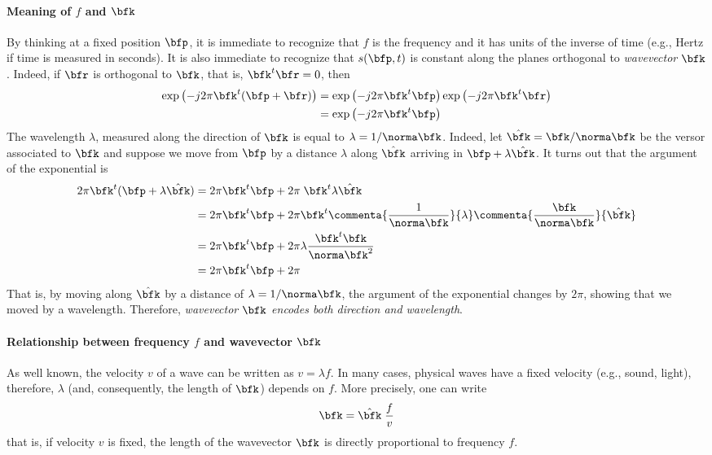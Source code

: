 \documentclass[11pt]{article}
\newcommand{\wv}{\bfk}
\newcommand{\wvn}{\hat\wv}
\newcommand{\x}[1][0]{\ifcase #1\bfp \or\bfq\else x#1\fi}
\newcommand{\sig}[1][\x,t]{s({#1})}
\begin{document}
\paragraph{Meaning of $f$ and $\wv$} By thinking
 at a fixed position $\x$, it 
is immediate to recognize that $f$ is the frequency and it has units
of the inverse of time (e.g., Hertz if time is measured in seconds).
It is also immediate to recognize that $\sig$ is constant along the
planes orthogonal to \emph{wavevector} $\wv$. Indeed, if $\bfr$ is
orthogonal to $\wv$, that is, $\wv^t\bfr=0$, then
%
\begin{equation}
  \label{eq:2;beamforming-notes}
  \begin{split}
\exp\left(-j 2\pi \wv^t(\x+\bfr) \right)
&= \exp\left(-j 2\pi \wv^t\x \right)
\exp\left(-j 2\pi \wv^t\bfr \right)\\
&= \exp\left(-j 2\pi \wv^t\x \right)
  \end{split}
\end{equation}
%
  The wavelength $\lambda$, measured along the direction of $\wv$ is
  equal to $\lambda=1/\norma\wv$.  Indeed, let $\wvn = \wv/\norma\wv$
  be the versor associated to $\wv$ and suppose we move from $\x$ by a
  distance $\lambda$ along $\wvn$ arriving in $\x+\lambda\wvn$.  It
  turns out that the argument of the exponential is
%
\begin{equation}
\label{eq:3;beamforming-notes}
\begin{split}
  2\pi \wv^t(\x+\lambda\wvn)
  &=   2\pi \wv^t\x+2\pi\;\wv^t \lambda\wvn\\
  &=   2\pi \wv^t\x+2\pi\wv^t \commenta{\frac{1}{\norma\wv}}{\lambda}
  \commenta{\frac{\wv}{\norma\wv}}{\wvn} \\
  &=   2\pi \wv^t\x+2\pi \lambda\frac{\wv^t\wv}{\norma\wv^2}\\
  &=   2\pi \wv^t\x+2\pi
\end{split}
\end{equation}
%
That is, by moving along $\wvn$ by a distance of $\lambda=1/\norma\wv$, the
argument of the exponential changes by $2\pi$, showing that we moved
by a wavelength.  Therefore, \emph{wavevector $\wv$ encodes both
  direction and wavelength}.


\paragraph{Relationship between frequency $f$ and wavevector $\wv$}
As well known, the velocity $v$ of a wave can be written as $v=\lambda
f$. In many cases, physical waves have a fixed velocity (e.g., sound,
light), therefore,   $\lambda$ (and, consequently, the length
of $\wv$) depends on $f$.  More precisely, one can write
%
\begin{equation}
\label{eq:4;beamforming-notes}
\wv = \wvn\; \frac{f}{v}
\end{equation}
%
that is, if velocity $v$ is fixed, the length of the wavevector $\wv$ is
directly proportional to frequency $f$.
\end{document}

